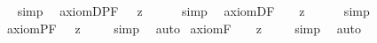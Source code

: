 \begin{isabellebody}
\isadelimproof
\ %
\endisadelimproof
%
\isatagproof
{}\isamarkupfalse%
\ simp\ \isamarkupfalse%
%
\endisatagproof
{\isafoldproof}%
%
\isadelimproof
%
\endisadelimproof
\isanewline
\isanewline
{}\isamarkupfalse%
\ axiom{\isacharunderscore}D{\isacharunderscore}PF{\isacharcolon}\ {\isachardoublequoteopen}{\isacharbrackleft}{\isasymbox}\ {\isacharcomma}{\isasymphi}{\isacharcomma}\ {\isasymrightarrow}\isactrlsup z\ {\isasymbox}\ {\isacharparenleft}{\isasymbox}\ {\isacharcomma}{\isasymphi}{\isacharcomma}{\isacharparenright}{\isacharbrackright}{\isachardoublequoteclose}%
\isadelimproof
\ %
\endisadelimproof
%
\isatagproof
{}\isamarkupfalse%
\ simp\ \isamarkupfalse%
%
\endisatagproof
{\isafoldproof}%
%
\isadelimproof
%
\endisadelimproof
\isanewline
{}\isamarkupfalse%
\ axiom{\isacharunderscore}D{\isacharunderscore}F{\isacharcolon}\ \ {\isachardoublequoteopen}{\isacharbrackleft}{\isasymbox}\ {\isacharsemicolon}{\isasymphi}{\isacharsemicolon}\ {\isasymrightarrow}\isactrlsup z\ {\isasymbox}\ {\isacharparenleft}{\isasymbox}\ {\isacharsemicolon}{\isasymphi}{\isacharsemicolon}{\isacharparenright}{\isacharbrackright}{\isachardoublequoteclose}%
\isadelimproof
\ %
\endisadelimproof
%
\isatagproof
{}\isamarkupfalse%
\ simp\ \isamarkupfalse%
%
\endisatagproof
{\isafoldproof}%
%
\isadelimproof
%
\endisadelimproof
\isanewline
\isanewline
{}\isamarkupfalse%
\ axiom{\isacharunderscore}{}{\isacharunderscore}PF{\isacharcolon}\ {\isachardoublequoteopen}{\isacharbrackleft}{\isasymbox}\ {\isacharcomma}{\isasymphi}{\isacharcomma}\ {\isasymrightarrow}\isactrlsup z\ {\isasymdiamond}\ {\isacharcomma}{\isasymphi}{\isacharcomma}{\isacharbrackright}{\isachardoublequoteclose}%
\isadelimproof
\ %
\endisadelimproof
%
\isatagproof
{}\isamarkupfalse%
\ simp\ \isamarkupfalse%
\ auto%
\endisatagproof
{\isafoldproof}%
%
\isadelimproof
%
\endisadelimproof
\isanewline
{}\isamarkupfalse%
\ axiom{\isacharunderscore}{}{\isacharunderscore}F{\isacharcolon}\ \ {\isachardoublequoteopen}{\isacharbrackleft}{\isasymbox}\ {\isacharsemicolon}{\isasymphi}{\isacharsemicolon}\ {\isasymrightarrow}\isactrlsup z\ {\isasymdiamond}\ {\isacharsemicolon}{\isasymphi}{\isacharsemicolon}{\isacharbrackright}{\isachardoublequoteclose}%
\isadelimproof
\ %
\endisadelimproof
%
\isatagproof
{}\isamarkupfalse%
\ simp\ \isamarkupfalse%
\ auto%
\endisatagproof
{\isafoldproof}%
%
\isadelimproof

\end{isabellebody}
